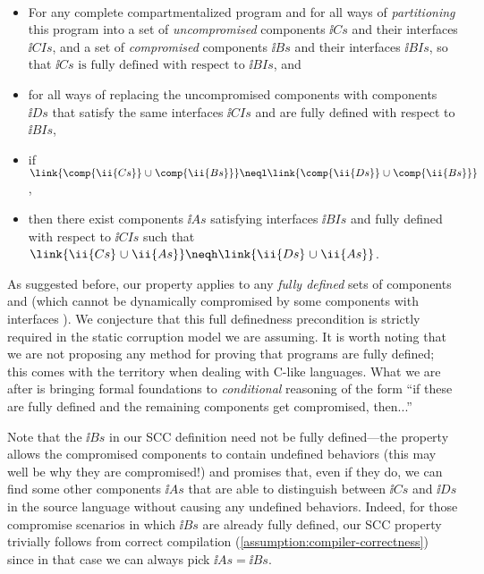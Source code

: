 \documentclass[10pt, conference, compsocconf, letterpaper, times]{IEEEtran}
\begin{document}
\begin{defn}[SCC]~
\begin{itemize}
\item For any complete compartmentalized program and
for all ways of {\em partitioning} this program into
a set of {\em uncompromised} components $\ii{Cs}$
and their interfaces $\ii{CIs}$,
and a set of {\em compromised} components $\ii{Bs}$
and their interfaces $\ii{BIs}$, so that
$\ii{Cs}\text{ is {fully defined} with respect to }\ii{BIs}$, and 
\item for all ways of replacing the uncompromised components with
  components $\ii{Ds}$ that satisfy the same interfaces $\ii{CIs}$
  and are {fully defined} with respect to $\ii{BIs}$, 
\item if $\link{\comp{\ii{Cs}} \mathrel{\cup} \comp{\ii{Bs}}}
    \neql \link{\comp{\ii{Ds}} \mathrel{\cup} \comp{\ii{Bs}}}$,
\item then there exist components $\ii{As}$ satisfying interfaces $\ii{BIs}$
  and {fully defined} with respect to $\ii{CIs}$ such that\\
         $\link{\ii{Cs} \mathrel{\cup} \ii{As}}
    \neqh \link{\ii{Ds} \mathrel{\cup} \ii{As}}$.
\end{itemize}
\end{defn}







As suggested before, our property applies to any {\em fully defined}
sets of components  and  (which cannot be dynamically
compromised by some components with interfaces \ifsooner{}\fi).
We conjecture that this full definedness precondition is strictly
required in the static corruption model we are assuming.
It is worth noting that we are not proposing any method for proving that
programs are fully 
defined; this comes with the territory when dealing with
C-like languages.
What we are after is bringing formal foundations
to {\em conditional} reasoning of the form ``if these  are fully
defined and the remaining components  get compromised,
then...''

Note that the $\ii{Bs}$ in our SCC definition need not be fully defined---\IE the
property allows the compromised components to contain undefined
behaviors (this may well be why they are compromised!) and promises
that, even if they do, we can find some other components $\ii{As}$
that are able to distinguish between $\ii{Cs}$ and $\ii{Ds}$ in
the source language without causing any undefined behaviors.
Indeed, for those compromise scenarios in which $\ii{Bs}$ are already
fully defined, our SCC property trivially follows from correct
compilation (\autoref{assumption:compiler-correctness}) since in that case
we can always pick $\ii{As} = \ii{Bs}$.
\end{document}
